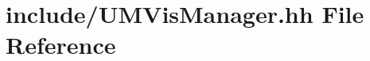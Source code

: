 \hypertarget{UMVisManager_8hh}{}\section{include/\+U\+M\+Vis\+Manager.hh File Reference}
\label{UMVisManager_8hh}
